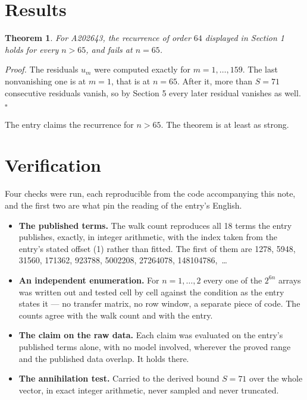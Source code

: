 \documentclass[11pt]{article}
\newtheorem{theorem}{Theorem}
\theoremstyle{definition}
\begin{document}
\section{Results}

\begin{theorem} For A202643, the recurrence of order $64$ displayed in Section 1 holds for every $n > 65$, and fails at $n = 65$.\end{theorem}

{\itshape Proof.} The residuals $u_m$ were computed exactly for $m = 1,\dots,159$. The last nonvanishing one is at $m = 1$, that is at $n = 65$. After it, more than $S = 71$ consecutive residuals vanish, so by Section 5 every later residual vanishes as well. $\square$

The entry claims the recurrence for $n > 65$. The theorem is at least as strong.

\section{Verification}

Four checks were run, each reproducible from the code accompanying this note, and the first two are what pin the reading of the entry's English.

\begin{itemize}

\item {\bfseries The published terms.} The walk count reproduces all 18 terms the entry publishes, exactly, in integer arithmetic, with the index taken from the entry's stated offset (1) rather than fitted. The first of them are 1278, 5948, 31560, 171362, 923788, 5002208, 27264078, 148104786,~\dots

\item {\bfseries An independent enumeration.} For $n = 1,\dots,2$ every one of the $2^{6n}$ arrays was written out and tested cell by cell against the condition as the entry states it --- no transfer matrix, no row window, a separate piece of code. The counts agree with the walk count and with the entry.

\item {\bfseries The claim on the raw data.} Each claim was evaluated on the entry's published terms alone, with no model involved, wherever the proved range and the published data overlap. It holds there.

\item {\bfseries The annihilation test.} Carried to the derived bound $S = 71$ over the whole vector, in exact integer arithmetic, never sampled and never truncated.

\end{itemize}
\end{document}
